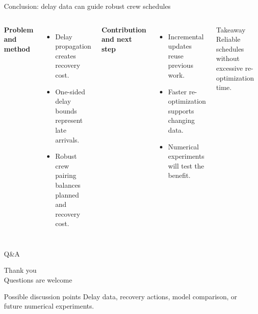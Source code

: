\documentclass[aspectratio=169,11pt]{beamer}
\newenvironment{compactitem}{%
  \begin{itemize}
  \setlength{\itemsep}{1pt}
  \setlength{\parskip}{0pt}
}{\end{itemize}}
\begin{document}
\begin{frame}{Conclusion: delay data can guide robust crew schedules}
  \begin{columns}[T,onlytextwidth]
      \textbf{Problem and method}
      \begin{compactitem}
        \item Delay propagation creates recovery cost.
        \item One-sided delay bounds represent late arrivals.
        \item Robust crew pairing balances planned and recovery cost.
      \end{compactitem}

      \textbf{Contribution and next step}
      \begin{compactitem}
        \item Incremental updates reuse previous work.
        \item Faster re-optimization supports changing data.
        \item Numerical experiments will test the benefit.
      \end{compactitem}

      \begin{alertblock}{Takeaway}
        Reliable schedules without excessive re-optimization time.
      \end{alertblock}
  \end{columns}
\end{frame}

\begin{frame}{Q\&A}
  \begin{center}
    \vspace{0.7cm}
    {\Large Thank you}\\[0.35cm]
    {\large Questions are welcome}\\[0.55cm]

    \begin{block}{Possible discussion points}
      Delay data, recovery actions, model comparison, or future numerical experiments.
    \end{block}
  \end{center}
\end{frame}
\end{document}
